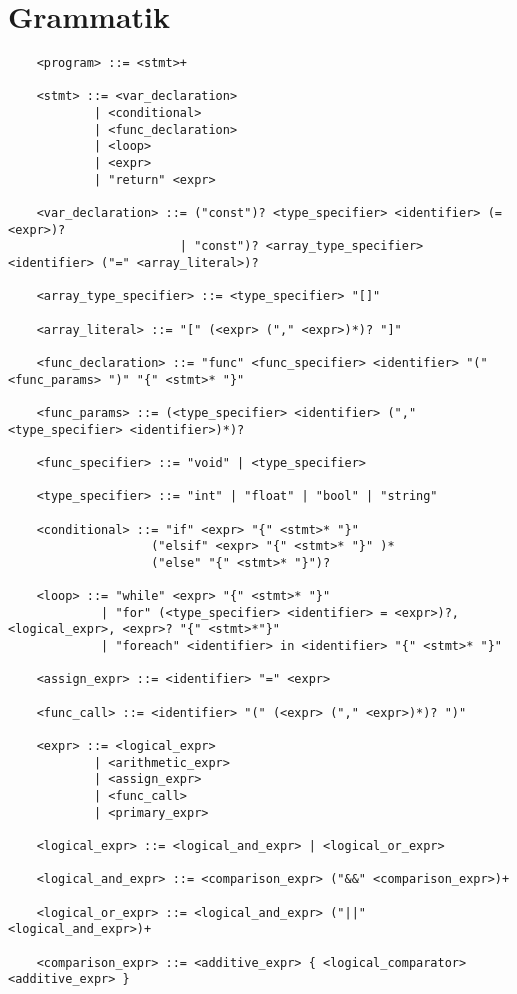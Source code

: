 \documentclass{TDP003mall}
\begin{document}
    \section{Grammatik}
    \begin{verbatim}
    <program> ::= <stmt>+

    <stmt> ::= <var_declaration> 
            | <conditional>
            | <func_declaration>
            | <loop>
            | <expr>
            | "return" <expr>

    <var_declaration> ::= ("const")? <type_specifier> <identifier> (= <expr>)?
                        | "const")? <array_type_specifier> <identifier> ("=" <array_literal>)?

    <array_type_specifier> ::= <type_specifier> "[]"

    <array_literal> ::= "[" (<expr> ("," <expr>)*)? "]"

    <func_declaration> ::= "func" <func_specifier> <identifier> "(" <func_params> ")" "{" <stmt>* "}"

    <func_params> ::= (<type_specifier> <identifier> ("," <type_specifier> <identifier>)*)? 

    <func_specifier> ::= "void" | <type_specifier>

    <type_specifier> ::= "int" | "float" | "bool" | "string"

    <conditional> ::= "if" <expr> "{" <stmt>* "}"
                    ("elsif" <expr> "{" <stmt>* "}" )*
                    ("else" "{" <stmt>* "}")?

    <loop> ::= "while" <expr> "{" <stmt>* "}"
             | "for" (<type_specifier> <identifier> = <expr>)?, <logical_expr>, <expr>? "{" <stmt>*"}"
             | "foreach" <identifier> in <identifier> "{" <stmt>* "}"

    <assign_expr> ::= <identifier> "=" <expr>

    <func_call> ::= <identifier> "(" (<expr> ("," <expr>)*)? ")"

    <expr> ::= <logical_expr> 
            | <arithmetic_expr> 
            | <assign_expr>
            | <func_call>
            | <primary_expr>

    <logical_expr> ::= <logical_and_expr> | <logical_or_expr>

    <logical_and_expr> ::= <comparison_expr> ("&&" <comparison_expr>)+

    <logical_or_expr> ::= <logical_and_expr> ("||" <logical_and_expr>)+

    <comparison_expr> ::= <additive_expr> { <logical_comparator> <additive_expr> }


\end{verbatim}
\end{document}
